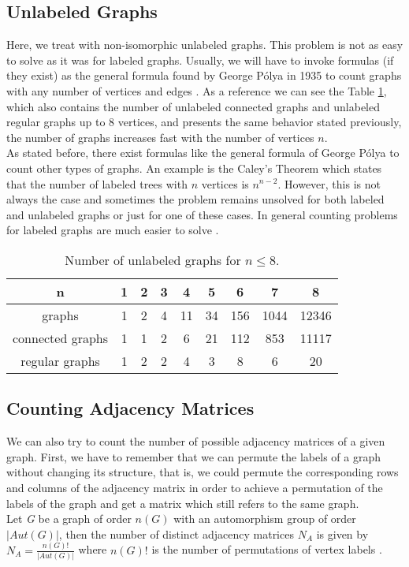 \subsection{Unlabeled Graphs}
Here, we treat with non-isomorphic unlabeled graphs. This problem is not as easy to solve as it was for labeled graphs. Usually, we will have to invoke formulas (if they exist) as the general formula found by George Pólya in 1935 to count graphs with any number of vertices and edges \cite{wilsonwatkins}. As a reference we can see the Table \ref{tab:unlabeled_graphs}, which also contains the number of unlabeled connected graphs and unlabeled regular graphs up to $8$ vertices, and presents the same behavior stated previously, the number of graphs increases fast with the number of vertices $n$.\\

As stated before, there exist formulas like the general formula of George Pólya to count other types of graphs. An example is the Caley's Theorem which states that the number of labeled trees with $n$ vertices is $ n^{n-2}$. However, this is not always the case and sometimes the problem remains unsolved for both labeled and unlabeled graphs or just for one of these cases. In general counting problems for labeled graphs are much easier to solve \cite{wilsonwatkins}.

\begin{table}[t]
\centering
\begin{tabular}{ |c|c|c|c|c|c|c|c|c| } 
 \hline
 n & 1 & 2 & 3 & 4 & 5 & 6 & 7 &8 \\ 
 \hline
 \hline
 graphs & 1 & 2 & 4 & 11 & 34 & 156 & 1044 & 12346 \\ 
 \hline
 connected graphs & 1 & 1 & 2 & 6& 21 & 112 & 853 & 11117 \\ 
 \hline
 regular graphs & 1 & 2 & 2 & 4 & 3 & 8 & 6 & 20 \\ 
 \hline
\end{tabular}
 \caption{Number of unlabeled graphs for $n \leq 8 $.}
 \label{tab:unlabeled_graphs}
\end{table}

\subsection{Counting Adjacency Matrices}
We can also try to count the number of possible adjacency matrices of a given graph. First, we have to remember that we can permute the labels of a graph without changing its structure, that is, we could permute the corresponding rows and columns of the adjacency matrix in order to achieve a permutation of the labels of the graph and get a matrix which still refers to the same graph. \\
Let \textit{G} be a graph of order $n(G)$ with an automorphism group of order $|Aut(G)|$, then the number of distinct adjacency matrices $N_{A}$ is given by
$N_{A}=\frac{n(G)!}{|Aut(G)|}$
where $n(G)!$ is the number of permutations of vertex labels \cite{adjacency}.


